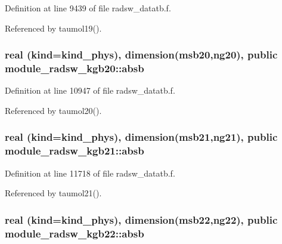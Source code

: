 Definition at line 9439 of file radsw\+\_\+datatb.\+f.



Referenced by taumol19().

\subsubsection[{\texorpdfstring{absb}{absb}}]{\setlength{\rightskip}{0pt plus 5cm}real (kind=kind\+\_\+phys), dimension(msb20,ng20), public module\+\_\+radsw\+\_\+kgb20\+::absb}\hypertarget{group__module__radsw__main_gaf5b135f82f34831e86a12f726cbe47ad}{}\label{group__module__radsw__main_gaf5b135f82f34831e86a12f726cbe47ad}


Definition at line 10947 of file radsw\+\_\+datatb.\+f.



Referenced by taumol20().

\subsubsection[{\texorpdfstring{absb}{absb}}]{\setlength{\rightskip}{0pt plus 5cm}real (kind=kind\+\_\+phys), dimension(msb21,ng21), public module\+\_\+radsw\+\_\+kgb21\+::absb}\hypertarget{group__module__radsw__main_ga1d3f12f050c90be49f109205c463b29b}{}\label{group__module__radsw__main_ga1d3f12f050c90be49f109205c463b29b}


Definition at line 11718 of file radsw\+\_\+datatb.\+f.



Referenced by taumol21().

\subsubsection[{\texorpdfstring{absb}{absb}}]{\setlength{\rightskip}{0pt plus 5cm}real (kind=kind\+\_\+phys), dimension(msb22,ng22), public module\+\_\+radsw\+\_\+kgb22\+::absb}\hypertarget{group__module__radsw__main_ga60403e7d343c85e965f3507b0db0f2a5}{}\label{group__module__radsw__main_ga60403e7d343c85e965f3507b0db0f2a5}


